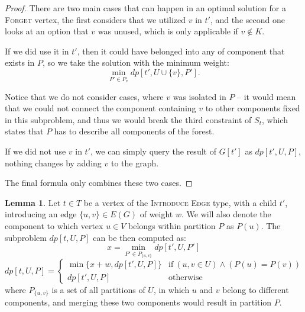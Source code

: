 \documentclass[thesis=M,english,hidelinks]{FITthesis}[2012/10/20]
\theoremstyle{definition}
\newtheorem{lemma}{Lemma}
\begin{document}
\begin{proof}
    There are two main cases that can happen in an optimal solution for a \textsc{Forget} vertex, the first considers that
    we utilized $v$ in $t'$, and the second one looks at an option that $v$ was unused, which is only applicable if $v
    \notin K$.

    If we did use it in $t'$, then it could have belonged into any of component that exists in $P$, so we take
    the solution with the minimum weight:
    $$
    \min_{P' \in P_v} dp[t', U \cup \{v\}, P'].
    $$

    Notice that we do not consider cases, where $v$ was isolated in $P$ -- it would mean that we could not
    connect the component containing $v$ to other components fixed in this subproblem, and thus we would break the third
    constraint of $S_t$, which states that $P$ has to describe all components of the forest.

    If we did not use $v$ in $t'$, we can simply query the result of $G[t']$ as $dp[t', U, P]$,
    nothing changes by adding $v$ to the graph.

    The final formula only combines these two cases.
\end{proof}

\begin{lemma}
    Let $t \in T$ be a vertex of the \textsc{Introduce Edge} type, with a child $t'$, introducing an edge $\{u, v\} \in
    E(G)$ of weight $w$. We will also denote the component to which vertex $u \in V$ belongs within partition
    $P$ as $P(u)$. The subproblem $dp[t, U, P]$ can be then computed as:
    $$
    x = \min_{P' \in P_{\{u, v\}}} dp[t', U, P']
    $$
    $$
    dp[t, U, P] =
    \begin{cases}
        \min \{x + w, dp[t', U, P]\} & \text{if}\ (u, v \in U) \land (P(u) = P(v)) \\
        dp[t', U, P] & \text{otherwise}
    \end{cases}
    $$
    where $P_{\{u, v\}}$ is a set of all partitions of $U$, in which $u$ and $v$ belong to different components, and
    merging these two components would result in partition $P$.
\end{lemma}
\end{document}

